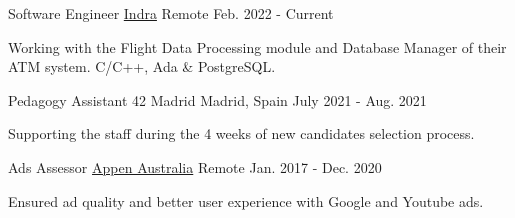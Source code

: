 

\begin{cventries}

  \cventry
    {Software Engineer}
    {\href{https://www.indracompany.com/en/air-traffic-control-automation-system-0}{Indra}}
    {Remote}
    {Feb. 2022 - Current}
     {
      \begin{cvitems}
        \item {Working with the Flight Data Processing module and Database Manager of their ATM system. C/C++, Ada \& PostgreSQL.}
      \end{cvitems}
    }

  \cventry
    {Pedagogy Assistant} %
    {42 Madrid} %
    {Madrid, Spain} %
    {July 2021 - Aug. 2021} %
    {
      \begin{cvitems} %
        \item {Supporting the staff during the 4 weeks of new candidates selection process.}
      \end{cvitems}
    }

  \cventry
    {Ads Assessor}
    {\href{https://appen.com/}{Appen Australia}}
    {Remote}
    {Jan. 2017 - Dec. 2020}
     {
      \begin{cvitems}
        \item {Ensured ad quality and better user experience with Google and Youtube ads.}
      \end{cvitems}
    }



\end{cventries}
